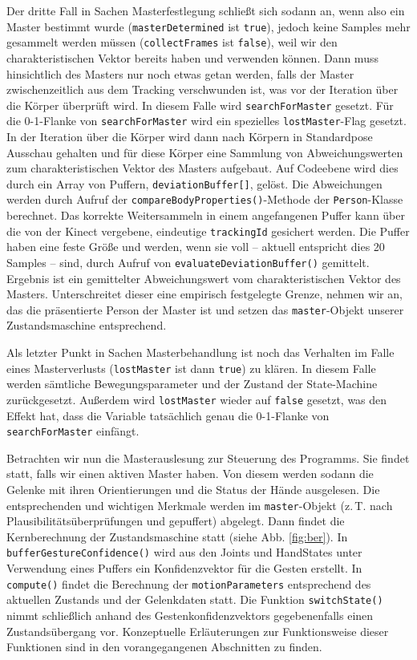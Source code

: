 Der dritte Fall in Sachen Masterfestlegung schließt sich sodann an, wenn also ein Master bestimmt wurde (\texttt{masterDetermined} ist \texttt{true}), jedoch keine Samples mehr gesammelt werden müssen (\texttt{collectFrames} ist \texttt{false}), weil wir den charakteristischen Vektor bereits haben und verwenden können. Dann muss hinsichtlich des Masters nur noch etwas getan werden, falls der Master zwischenzeitlich aus dem Tracking verschwunden ist, was vor der Iteration über die Körper überprüft wird. In diesem Falle wird \texttt{searchForMaster} gesetzt. Für die 0-1-Flanke von \texttt{searchForMaster} wird ein spezielles \texttt{lostMaster}-Flag gesetzt. In der Iteration über die Körper wird dann nach Körpern in Standardpose Ausschau gehalten und für diese Körper eine Sammlung von Abweichungswerten zum charakteristischen Vektor des Masters aufgebaut. Auf Codeebene wird dies durch ein Array von Puffern, \texttt{deviationBuffer[]}, gelöst. Die Abweichungen werden durch Aufruf der \texttt{compareBodyProperties()}-Methode der \texttt{Person}-Klasse berechnet. Das korrekte Weitersammeln in einem angefangenen Puffer kann über die von der Kinect vergebene, eindeutige \texttt{trackingId} gesichert werden. Die Puffer haben eine feste Größe und werden, wenn sie voll -- aktuell entspricht dies 20 Samples -- sind, durch Aufruf von \texttt{evaluateDeviationBuffer()} gemittelt. Ergebnis ist ein gemittelter Abweichungswert vom charakteristischen Vektor des Masters. Unterschreitet dieser eine empirisch festgelegte Grenze, nehmen wir an, das die präsentierte Person der Master ist und setzen das \texttt{master}-Objekt unserer Zustandsmaschine entsprechend.\par 
Als letzter Punkt in Sachen Masterbehandlung ist noch das Verhalten im Falle eines Masterverlusts (\texttt{lostMaster} ist dann \texttt{true}) zu klären. In diesem Falle werden sämtliche Bewegungsparameter und der Zustand der State-Machine zurückgesetzt. Außerdem wird \texttt{lostMaster} wieder auf \texttt{false} gesetzt, was den Effekt hat, dass die Variable tatsächlich genau die 0-1-Flanke von \texttt{searchForMaster} einfängt.\par\medskip
Betrachten wir nun die Masterauslesung zur Steuerung des Programms. Sie findet statt, falls wir einen aktiven Master haben. Von diesem werden sodann die Gelenke mit ihren Orientierungen und die Status der Hände ausgelesen. Die entsprechenden und wichtigen Merkmale werden im \texttt{master}-Objekt (z.\,T. nach Plausibilitätsüberprüfungen und gepuffert) abgelegt. Dann findet die Kernberechnung der Zustandsmaschine statt (siehe Abb. \ref{fig:ber}). In \texttt{bufferGestureConfidence()} wird aus den Joints und HandStates unter Verwendung eines Puffers ein Konfidenzvektor für die Gesten erstellt. In \texttt{compute()} findet die Berechnung der \texttt{motionParameters} entsprechend des aktuellen Zustands und der Gelenkdaten statt. Die Funktion \texttt{switchState()} nimmt schließlich anhand des Gestenkonfidenzvektors gegebenenfalls einen Zustandsübergang vor. Konzeptuelle Erläuterungen zur Funktionsweise dieser Funktionen sind in den vorangegangenen Abschnitten zu finden.\par\medskip
